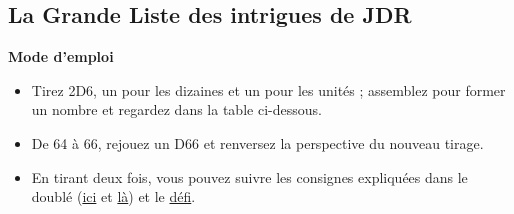 \subsection*{La Grande Liste des intrigues de JDR}

\noindent \textbf{Mode d'emploi}
\begin{itemize}
\item Tirez 2D6, un pour les dizaines et un pour les unités ; assemblez pour former un nombre et regardez dans la table ci-dessous.
\item De 64 à 66, rejouez un D66 et renversez la perspective du nouveau tirage.
\item En tirant deux fois, vous pouvez suivre les consignes expliquées dans le doublé (\hyperref[double1]{ici} et \hyperref[double2]{là}) et le \hyperref[defi]{défi}.
\end{itemize}

\vspace{0.3cm}


